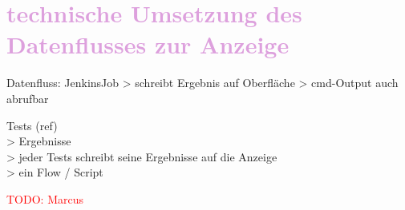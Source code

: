 \section{\textcolor{Plum}{technische Umsetzung des Datenflusses zur Anzeige}}
\label{ch:IST-Zustand:sec:Datenfluss}
Datenfluss: JenkinsJob > schreibt Ergebnis auf Oberfläche > cmd-Output auch abrufbar

Tests (ref)\\
> Ergebnisse\\
> jeder Tests schreibt seine Ergebnisse auf die Anzeige\\
> ein Flow / Script

\noindent
\textcolor{red}{TODO: Marcus}
